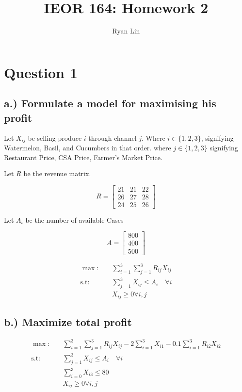 \documentclass{report}
\title{IEOR 164: Homework 2}
\author{Ryan Lin}
\date{}
\begin{document}
\maketitle
\section{Question 1}

\subsection*{a.) Formulate a model for maximising his profit}  
Let $ X_{ij}$ be selling produce $ i $ through channel $ j $. Where $ i\in \{1,2,3\} $, signifying Watermelon, Basil, and Cucumbers in that order. where $ j \in \{1,2,3\} $ signifying Restaurant Price, CSA Price, Farmer's Market Price. 


 Let $ R $ be the revenue matrix. 

 \[
R = \begin{bmatrix}
	21 &21 &22\\
	26 &27 &28\\
	24 &25 &26
\end{bmatrix} 
 \]

 Let $ A_i $ be the number of available Cases 

 \[
 A = \begin{bmatrix}
 	800\\400\\500
 \end{bmatrix}
 \]



 \begin{align*}
	 \max_{}: \quad & \sum_{i=1}^{3} \sum_{j=1}^{3} R_{ij} X_{ij}	\\
 \text{s.t}: \quad & \sum_{j=1}^{3} X_{ij} \le A_i \quad \forall i \\
		   &X_{ij} \ge 0 \forall i,j
 \end{align*}


 \subsection*{b.) Maximize total profit} 


 \begin{align*}
	 \max_{}: \quad & \sum_{i=1}^{3} \sum_{j=1}^{3} R_{ij} X_{ij} - 2\sum_{i=1}^{3}X_{i1} - 0.1\sum_{i=1}^{3} R_{i2}X_{i2}  	\\
 \text{s.t}: \quad & \sum_{j=1}^{3} X_{ij} \le A_i \quad \forall i \\
		   & \sum_{i=0}^{3}X_{i3} \le 80 \\ 
		   &	X_{ij} \ge 0 \forall i,j
 \end{align*}
\end{document}
